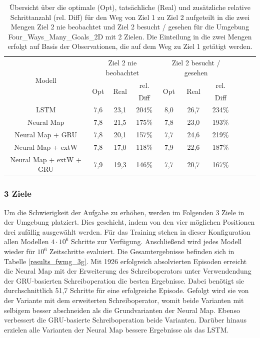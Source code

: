 \begin{table}
  \begin{tabular}{|c|c|c|c|c|c|c|c|c|c|}
    \hline
    \multirow{3}{*}{Modell} & \multicolumn{3}{|c|}{Ziel 2 nie beobachtet} & \multicolumn{3}{|c|}{Ziel 2 besucht / gesehen} \\ \cline{2-7}
    & \multirow{2}{*}{Opt} & \multirow{2}{*}{Real} & rel. & \multirow{2}{*}{Opt} & \multirow{2}{*}{Real} & rel. \\
    & & & Diff & & & Diff \\ \hline
    LSTM & 7,6 & 23,1 & 204\% & 8,0 & 26,7 & 234\% \\ \hline
    Neural Map & 7,8 & 21,5 & 175\% & 7,8 & 23,0 & 193\% \\ \hline
    Neural Map + GRU & 7,8 & 20,1 & 157\% & 7,7 & 24,6 & 219\% \\ \hline
    Neural Map + extW & 7,8 & 17,0 & 118\% & 7,9 & 22,6 & 187\% \\ \hline
    Neural Map + extW + GRU & 7,9 & 19,3 & 146\% & 7,7 & 20,7 & 167\% \\ \hline
  \end{tabular}
  \caption{Übersicht über die optimale (Opt), tatsächliche (Real) und zusätzliche relative Schrittanzahl (rel. Diff) für den Weg von Ziel 1 zu Ziel 2 aufgeteilt in die zwei Mengen \glqq Ziel 2 nie beobachtet\grqq{} und \glqq Ziel 2 besucht / gesehen\grqq{} für die Umgebung \glqq Four\_Ways\_Many\_Goals\_2D\grqq{} mit 2 Zielen. Die Einteilung in die zwei Mengen erfolgt auf Basis der Observationen, die auf dem Weg zu Ziel 1 getätigt werden.}
  \label{results_fw2g_1_to_2_per_M}
\end{table}


\subsubsection{3 Ziele}

Um die Schwierigkeit der Aufgabe zu erhöhen, werden im Folgenden 3 Ziele in der Umgebung platziert. Dies geschieht, indem von den vier möglichen Positionen drei zufällig ausgewählt werden. Für das Training stehen in dieser Konfiguration allen Modellen $4\cdot10^6$ Schritte zur Verfügung. Anschließend wird jedes Modell wieder für $10^6$ Zeitschritte evaluiert. Die Gesamtergebnisse befinden sich in Tabelle \ref{results_fwmg_3g}. Mit 1926 erfolgreich absolvierten Episoden erreicht die Neural Map mit der Erweiterung des Schreiboperators unter Verwendendung der GRU-basierten Schreiboperation die besten Ergebnisse. Dabei benötigt sie durchschnittlich 51,7 Schritte für eine erfolgreiche Episode. Gefolgt wird sie von der Variante mit dem erweiterten Schreiboperator, womit beide Varianten mit selbigem besser abschneiden als die Grundvarianten der Neural Map. Ebenso verbessert die GRU-basierte Schreiboperation beide Varianten. Darüber hinaus erzielen alle Varianten der Neural Map bessere Ergebnisse als das LSTM.


